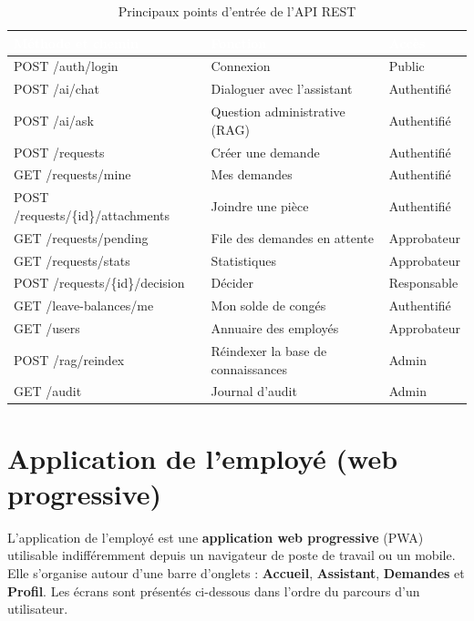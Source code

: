 \documentclass[a4paper,12pt,oneside]{report}
\newcommand{\thd}[1]{\textcolor{white}{\textbf{#1}}}
\begin{document}
\begin{table}[H]
\centering\small\setlength{\tabcolsep}{5pt}
\begin{tabular}{l l l}
\toprule
\rowcolor{gHead}\thd{Méthode et chemin} & \thd{Fonction} & \thd{Accès} \\
\midrule
\ttfamily POST /auth/login & Connexion & Public \\
\rowcolor{gBand}
\ttfamily POST /ai/chat & Dialoguer avec l'assistant & Authentifié \\
\ttfamily POST /ai/ask & Question administrative (RAG) & Authentifié \\
\rowcolor{gBand}
\ttfamily POST /requests & Créer une demande & Authentifié \\
\ttfamily GET /requests/mine & Mes demandes & Authentifié \\
\rowcolor{gBand}
\ttfamily POST /requests/\{id\}/attachments & Joindre une pièce & Authentifié \\
\ttfamily GET /requests/pending & File des demandes en attente & Approbateur \\
\rowcolor{gBand}
\ttfamily GET /requests/stats & Statistiques & Approbateur \\
\ttfamily POST /requests/\{id\}/decision & Décider & Responsable \\
\rowcolor{gBand}
\ttfamily GET /leave-balances/me & Mon solde de congés & Authentifié \\
\ttfamily GET /users & Annuaire des employés & Approbateur \\
\rowcolor{gBand}
\ttfamily POST /rag/reindex & Réindexer la base de connaissances & Admin \\
\ttfamily GET /audit & Journal d'audit & Admin \\
\bottomrule
\end{tabular}
\caption{Principaux points d'entrée de l'API REST}
\label{tab:api}
\end{table}

\section{Application de l'employé (web progressive)}
L'application de l'employé est une \textbf{application web progressive} (PWA)
utilisable indifféremment depuis un navigateur de poste de travail ou un mobile.
Elle s'organise autour d'une barre d'onglets : \textbf{Accueil},
\textbf{Assistant}, \textbf{Demandes} et \textbf{Profil}. Les écrans sont
présentés ci-dessous dans l'ordre du parcours d'un utilisateur.
\end{document}
